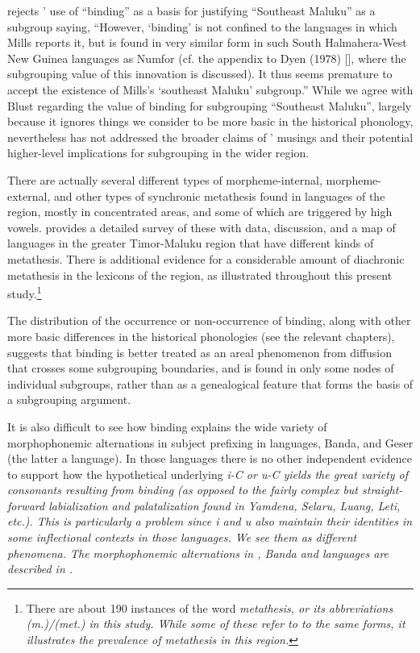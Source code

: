 \citet[276]{Blust1993} rejects \citeauthor{Mills1991}’ use of ``binding'' as a basis
for justifying “Southeast Maluku” as a subgroup saying,
“However, ‘binding’ is not confined to the languages in which
Mills reports it, but is found in very similar form in such South Halmahera-West
New Guinea languages as Numfor (cf.
the appendix to Dyen (1978) [\citealp{Dyen1978a}],
where the subgrouping value of this innovation is discussed).
It thus seems premature to accept the existence of Mills’s ‘southeast
Maluku’ subgroup.” 
While we agree with Blust regarding the value of binding for
subgrouping “Southeast Maluku”,
largely because it ignores things we consider to be more basic
in the historical phonology,
nevertheless \citeauthor{Blust1993} has
not addressed the broader claims of \citeauthor{Mills1991}’
musings and their potential higher-level implications for subgrouping
in the wider region.

There are actually several different types of morpheme-internal,
morpheme-external, and other types of synchronic metathesis found
in languages of the region,
mostly in concentrated areas,
and some of which are triggered by high vowels.
\citet[20--76]{Edwards2020} provides a detailed survey of these
with data, discussion, and a map of languages in the greater Timor-Maluku
region that have different kinds of metathesis.
There is additional evidence for a considerable amount of diachronic
metathesis in the lexicons of the region,
as illustrated throughout this present study.\footnote{
	There are about 190 instances of the word \it{metathesis},
	or its abbreviations \it{(m.)/(met.)} in this study.
	While some of these refer to to the same forms,
	it illustrates the prevalence of metathesis in this region.}

The distribution of the occurrence or non-occurrence of binding,
along with other more basic differences in the historical phonologies
(see the relevant chapters),
suggests that binding is better treated as an areal phenomenon
from diffusion that crosses some subgrouping boundaries,
and is found in only some nodes of individual subgroups,
rather than as a genealogical feature that
forms the basis of a subgrouping argument.

It is also difficult to see how binding explains the wide variety
of morphophonemic alternations in subject prefixing in 
languages, Banda, and Geser (the latter a  language).
In those languages there is no other independent evidence to
support how the hypothetical underlying \it{i}-C or \it{u}-C
yields the great variety of consonants resulting from binding
(as opposed to the fairly complex but straight-forward labialization
and palatalization found in Yamdena,
Selaru, Luang, Leti, etc.).
This is particularly a problem since \it{i}
and \it{u} also maintain their identities in some inflectional
contexts in those languages.
We see them as different phenomena.
The morphophonemic alternations in ,
Banda and  languages are described in .

